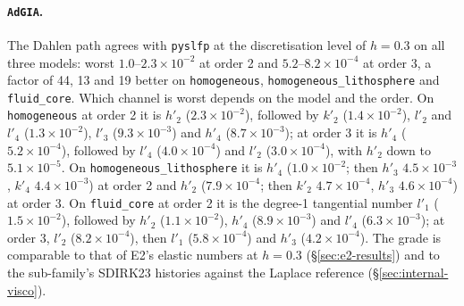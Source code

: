 \documentclass[11pt]{article}
\numberwithin{equation}{section}
\newcommand{\code}[1]{\texttt{#1}}
\begin{document}
\paragraph{\code{AdGIA}.} The Dahlen path agrees with \code{pyslfp} at the
discretisation level of $h=0.3$ on all three models: worst
$1.0$--$2.3\times10^{-2}$ at order 2 and $5.2$--$8.2\times10^{-4}$ at
order 3, a factor of 44, 13 and 19 better on \code{homogeneous},
\code{homogeneous\_lithosphere} and \code{fluid\_core}. Which channel is
worst depends on the model and the order. On \code{homogeneous} at order 2
it is $h'_2$ ($2.3\times10^{-2}$), followed by $k'_2$ ($1.4\times10^{-2}$),
$l'_2$ and $l'_4$ ($1.3\times10^{-2}$), $l'_3$ ($9.3\times10^{-3}$) and
$h'_4$ ($8.7\times10^{-3}$); at order 3 it is $h'_4$ ($5.2\times10^{-4}$),
followed by $l'_4$ ($4.0\times10^{-4}$) and $l'_2$ ($3.0\times10^{-4}$),
with $h'_2$ down to $5.1\times10^{-5}$. On \code{homogeneous\_lithosphere}
it is $h'_4$ ($1.0\times10^{-2}$; then $h'_3$ $4.5\times10^{-3}$, $k'_4$
$4.4\times10^{-3}$) at order 2 and $h'_2$ ($7.9\times10^{-4}$; then $k'_2$
$4.7\times10^{-4}$, $h'_3$ $4.6\times10^{-4}$) at order 3. On
\code{fluid\_core} at order 2 it is the degree-1 tangential number $l'_1$
($1.5\times10^{-2}$), followed by $h'_2$ ($1.1\times10^{-2}$), $h'_4$
($8.9\times10^{-3}$) and $l'_4$ ($6.3\times10^{-3}$); at order 3, $l'_2$
($8.2\times10^{-4}$), then $l'_1$ ($5.8\times10^{-4}$) and $h'_3$
($4.2\times10^{-4}$). The grade is comparable to that of E2's elastic numbers at $h=0.3$
(\S\ref{sec:e2-results}) and to the sub-family's SDIRK23 histories against
the Laplace reference (\S\ref{sec:internal-visco}).
\end{document}
